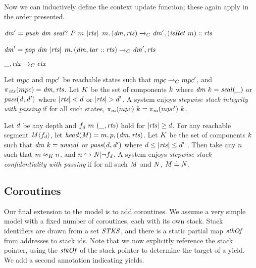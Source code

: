 \documentclass[acmsmall,review,anonymous]{acmart}\settopmatter{printfolios=true,printccs=false,printacmref=false}
\begin{document}
Now we can inductively define the context update function; these again apply in the order
presented. 

            {\(\mathit{dm}' = \mathit{push} ~ \mathit{dm} ~ \mathit{seal?} ~ P ~ m ~ |\mathit{rts}|\)}
            {\(m,(\mathit{dm},\mathit{rts}) \xrightarrow{}_C \mathit{dm}',(\mathit{isRet} ~ m)::\mathit{rts}\)}

            {\(\mathit{dm}' = \mathit{pop} ~ \mathit{dm} ~ |\mathit{rts}|\)}
            {\(m,(\mathit{dm},\mathit{tar}::\mathit{rts}) \xrightarrow{}_C \mathit{dm}',\mathit{rts}\)}

\judgment[ Default]
         {}
         {\(\_,\mathit{ctx} \xrightarrow{}_C \mathit{ctx}\)}

 Let \(mpc\) and \(mpc'\) be reachable states such that
\(mpc \overset{}{\rightharpoonup}_C mpc'\), and \(\pi_{\mathit{ctx}}(mpc) = \mathit{dm},\mathit{rts}\).
Let \(K\) be the set of components \(k\) where
\(\mathit{dm} ~ k = \mathit{seal(\_)}\) or \(\mathit{pass(d,d')}\) where \(|\mathit{rts}| < d\)
or \(|\mathit{rts}| > d'\). A system enjoys {\em stepwise stack integrity with passing} if for all
such states, \(\pi_m(mpc) ~ k = \pi_m(mpc') ~ k\).

 Let \(d\) be any depth and \(f_d ~ m ~ (\_, \mathit{rts})\) hold for
\(|\mathit{rts}| \geq d\). For any reachable segment \(\mathit{M} \langle f_d \rangle\),
let \(\mathit{head}(\mathit{M}) = m,p,(\mathit{dm},\mathit{rts})\). Let
\(K\) be the set of components \(k\) such that
\(\mathit{dm} ~ k = \mathit{unseal}\) or \(\mathit{pass(d,d')}\) where
\(d \leq |\mathit{rts}| \leq d'\) .
Then take any \(n\) such that \(m \approx_K n\), and
\(n \hookrightarrow \mathit{N} | \neg f_d\). A system enjoys
{\em stepwise stack confidentiality with passing} if for all such \(\mathit{M}\) and \(\mathit{N}\),
\(\mathit{M} \doteq \mathit{N}\).

\subsection{Coroutines}

Our final extension to the model is to add coroutines. We assume a very simple model with
a fixed number of coroutines, each with its own stack.
Stack identifiers are drawn from a set \(\mathit{STKS}\), and there is a static partial map
\(\mathit{stkOf}\) from addresses to stack ids. Note that we now explicitly reference the stack
pointer, using the \(\mathit{stkOf}\) of the stack pointer to determine the target of a yield.
We add a second annotation indicating yields.
\end{document}
